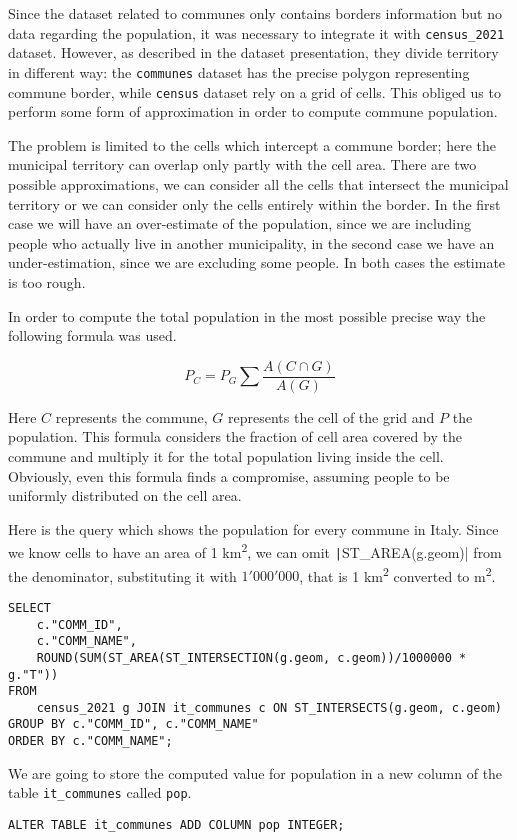 Since the dataset related to communes only contains borders information but no data regarding the population, it was necessary to integrate it with \texttt{census\_2021} dataset.
However, as described in the dataset presentation, they divide territory in different way: the \texttt{communes} dataset has the precise polygon representing commune border, while \texttt{census} dataset rely on a grid of cells.
This obliged us to perform some form of approximation in order to compute commune population.

The problem is limited to the cells which intercept a commune border; here the municipal territory can overlap only partly with the cell area.
There are two possible approximations, we can consider all the cells that intersect the municipal territory or we can consider only the cells entirely within the border.
In the first case we will have an over-estimate of the population, since we are including people who actually live in another municipality, in the second case we have an under-estimation, since we are excluding some people.
In both cases the estimate is too rough.

In order to compute the total population in the most possible precise way the following formula was used.

\begin{equation}
	P_{C} = P_{G} \sum \frac{A(C \cap G)}{A(G)}
\end{equation}

Here $C$ represents the commune, $G$ represents the cell of the grid and $P$ the population.
This formula considers the fraction of cell area covered by the commune and multiply it for the total population living inside the cell.
Obviously, even this formula finds a compromise, assuming people to be uniformly distributed on the cell area.

Here is the query which shows the population for every commune in Italy.
Since we know cells to have an area of 1 km\textsuperscript{2}, we can omit \texttt|ST_AREA(g.geom)| from the denominator, substituting it with $1'000'000$, that is 1 km\textsuperscript{2} converted to m\textsuperscript{2}.

\begin{verbatim}
SELECT 
	c."COMM_ID",
	c."COMM_NAME", 
	ROUND(SUM(ST_AREA(ST_INTERSECTION(g.geom, c.geom))/1000000 * g."T"))
FROM 
	census_2021 g JOIN it_communes c ON ST_INTERSECTS(g.geom, c.geom)
GROUP BY c."COMM_ID", c."COMM_NAME"
ORDER BY c."COMM_NAME";
\end{verbatim}

We are going to store the computed value for population in a new column of the table \texttt{it\_communes} called \texttt{pop}.

\begin{verbatim}
ALTER TABLE it_communes ADD COLUMN pop INTEGER;
\end{verbatim}























